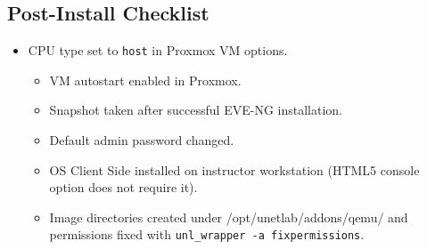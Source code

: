 \subsection{Post-Install Checklist}

\begin{itemize}
\tightlist
\item
  [$\checkmark$] CPU type set to \texttt{host} in Proxmox VM options.

  \begin{itemize}
  \tightlist
  \item
    [$\checkmark$] VM autostart enabled in Proxmox.
  \item
    [$\checkmark$] Snapshot taken after successful EVE-NG installation.
  \item
    [$\checkmark$] Default admin password changed.
  \item
    [$\checkmark$] OS Client Side installed on instructor workstation (HTML5 console option does not require it).
  \item
    [$\checkmark$] Image directories created under /opt/unetlab/addons/qemu/ and permissions fixed with \texttt{unl\_wrapper\ -a\ fixpermissions}.
  \end{itemize}
\end{itemize}
